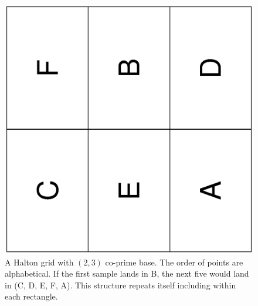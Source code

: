 \documentclass[titlepage]{article}
\begin{document}
\newpage

\begin{figure}[H]
	\centering
	\includegraphics[angle = -90, width = .8\textwidth]{HaltonGrid.eps}
	\caption{A Halton grid with $(2,3)$ co-prime base. The order of points are alphabetical. If the first sample lands in B, the next five would land in (C, D, E, F, A). This structure repeats itself including within each rectangle.}
	\label{grid}
\end{figure}

\newpage
\end{document}
